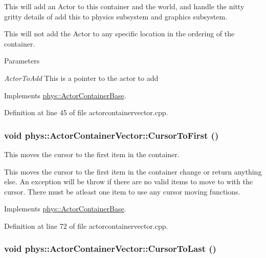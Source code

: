 This will add an Actor to this container and the world, and handle the nitty gritty details of add this to physics subsystem and graphics subsystem. \par
\par
 This will not add the Actor to any specific location in the ordering of the container. 
\begin{DoxyParams}{Parameters}
\item[{\em ActorToAdd}]This is a pointer to the actor to add \end{DoxyParams}


Implements \hyperlink{classphys_1_1ActorContainerBase_a8dd213cba4915f68ac421fc9f341cbbe}{phys::ActorContainerBase}.



Definition at line 45 of file actorcontainervector.cpp.

\hypertarget{classphys_1_1ActorContainerVector_ad9c2eb2a9405dcf687c86745afc9c031}{
\subsubsection[{CursorToFirst}]{\setlength{\rightskip}{0pt plus 5cm}void phys::ActorContainerVector::CursorToFirst ()}}
\label{d3/d64/classphys_1_1ActorContainerVector_ad9c2eb2a9405dcf687c86745afc9c031}


This moves the cursor to the first item in the container. 

This moves the cursor to the first item in the container change or return anything else. An exception will be throw if there are no valid items to move to with the cursor. There must be atleast one item to use any cursor moving functions. 

Implements \hyperlink{classphys_1_1ActorContainerBase_ab1a44758d7c17e70ff2e0f8de47424c3}{phys::ActorContainerBase}.



Definition at line 72 of file actorcontainervector.cpp.

\hypertarget{classphys_1_1ActorContainerVector_aa6b08266bbb57a22c07ab50514e58db4}{
\subsubsection[{CursorToLast}]{\setlength{\rightskip}{0pt plus 5cm}void phys::ActorContainerVector::CursorToLast ()}}
\label{d3/d64/classphys_1_1ActorContainerVector_aa6b08266bbb57a22c07ab50514e58db4}


